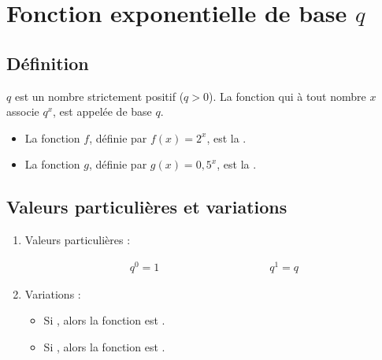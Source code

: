 \documentclass[12pt,a4paper]{article}
\date{}
\title{}
\begin{document}
{}

\section{Fonction exponentielle de base $q$}

\subsection{Définition}
\begin{mydef}
	 $q$ est un nombre strictement positif ($q > 0$).
	 La fonction qui à tout nombre $x$ associe $q^x$, est appelée  de base $q$.
\end{mydef}

\begin{myex}
	\begin{itemize}
		\item La fonction $f$, définie par $f(x)=2^x$, est la . 
		\item La fonction $g$, définie par $g(x)=0,5^x$, est la .
	\end{itemize}
	
\end{myex}


\subsection{Valeurs particulières et variations}

\begin{myprops}
	\begin{enumerate}
		\item Valeurs particulières :
		
		\begin{center}
			\begin{align*}
				q^0 = 1 \qquad\qquad\qquad\qquad\qquad q^1 = q 			
			\end{align*}
		\end{center}
		
		
		\item Variations :
			\begin{itemize}
				\item Si , alors la fonction est .
				\item Si , alors la fonction est .
			\end{itemize}
	\end{enumerate}
\end{myprops}
\end{document}
